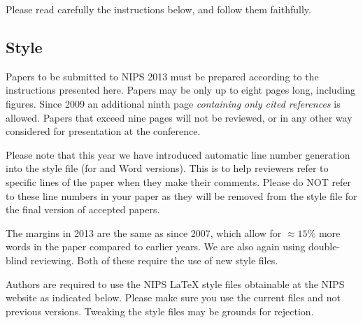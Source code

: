 \documentclass{article} %
\begin{document}
Please read carefully the
instructions below, and follow them faithfully.
\subsection{Style}

Papers to be submitted to NIPS 2013 must be prepared according to the
instructions presented here. Papers may be only up to eight pages long,
including figures. Since 2009 an additional ninth page \textit{containing only
cited references} is allowed. Papers that exceed nine pages will not be
reviewed, or in any other way considered for presentation at the conference.

Please note that this year we have introduced automatic line number generation
into the style file (for \LaTeXe and Word versions). This is to help reviewers
refer to specific lines of the paper when they make their comments. Please do
NOT refer to these line numbers in your paper as they will be removed from the
style file for the final version of accepted papers.

The margins in 2013 are the same as since 2007, which allow for $\approx 15\%$
more words in the paper compared to earlier years. We are also again using 
double-blind reviewing. Both of these require the use of new style files.

Authors are required to use the NIPS \LaTeX{} style files obtainable at the
NIPS website as indicated below. Please make sure you use the current files and
not previous versions. Tweaking the style files may be grounds for rejection.




\end{document}

